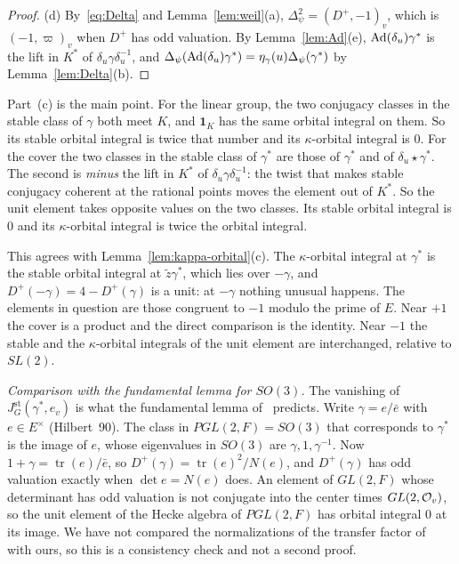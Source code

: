 \begin{proof}
(d) By~\eqref{eq:Delta} and Lemma~\ref{lem:weil}(a),
$\Delta_\psi^2=(D^+,-1)_v$, which is $(-1,\varpi)_v$ when $D^+$ has odd
valuation. By Lemma~\ref{lem:Ad}(e), $\operatorname{Ad}(\delta_u)\gamma^*$ is the lift
in $K^*$ of $\delta_u\gamma\delta_u^{-1}$, and $\Delta_\psi(\operatorname{Ad}(\delta_u)
\gamma^*)=\eta_\gamma(u)\Delta_\psi(\gamma^*)$ by Lemma~\ref{lem:Delta}(b).
\end{proof}

Part~(c) is the main point. For the linear group, the two conjugacy
classes in the stable class of $\gamma$ both meet $K$, and $\mathbf 1_K$
has the same orbital integral on them. So its stable orbital integral is
twice that number and its $\kappa$-orbital integral is $0$. For the
cover the two classes in the stable class of $\gamma^*$ are those of
$\gamma^*$ and of $\delta_u\star\gamma^*$. The second is \emph{minus} the
lift in $K^*$ of $\delta_u\gamma\delta_u^{-1}$: the twist that makes
stable conjugacy coherent at the rational points moves the element out
of $K^*$. So the unit element takes opposite values on the two classes.
Its stable orbital integral is $0$ and its $\kappa$-orbital integral is
twice the orbital integral.

This agrees with Lemma~\ref{lem:kappa-orbital}(c). The $\kappa$-orbital
integral at $\gamma^*$ is the stable orbital integral at
$\tilde z\gamma^*$, which lies over $-\gamma$, and $D^+(-\gamma)=
4-D^+(\gamma)$ is a unit: at $-\gamma$ nothing unusual happens. The
elements in question are those congruent to $-1$ modulo the prime of
$E$. Near $+1$ the cover is a product and the direct comparison is the
identity. Near $-1$ the stable and the $\kappa$-orbital integrals of the
unit element are interchanged, relative to $SL(2)$.

\begin{remarkrev}\label{rem:li-fl}
\emph{Comparison with the fundamental lemma for $SO(3)$.} The vanishing
of $J^{\mathrm{st}}_G(\gamma^*,e_v)$ is what the fundamental lemma
of~\cite{Li11} predicts. Write $\gamma=e/\bar e$ with $e\in E^\times$
(Hilbert~90). The class in $PGL(2,F)=SO(3)$ that corresponds to
$\gamma^*$ is the image of $e$, whose eigenvalues in $SO(3)$ are
$\gamma,1,\gamma^{-1}$. Now $1+\gamma=\operatorname{tr}(e)/\bar e$, so
$D^+(\gamma)=\operatorname{tr}(e)^2/N(e)$, and $D^+(\gamma)$ has odd
valuation exactly when $\det e=N(e)$ does. An element of $GL(2,F)$ whose
determinant has odd valuation is not conjugate into the center times
$GL(2,\mathcal{O}_v)$, so the unit element of the Hecke algebra of $PGL(2,F)$
has orbital integral $0$ at its image. We have not compared the
normalizations of the transfer factor of~\cite{Li11} with ours, so this
is a consistency check and not a second proof.
\end{remarkrev}

